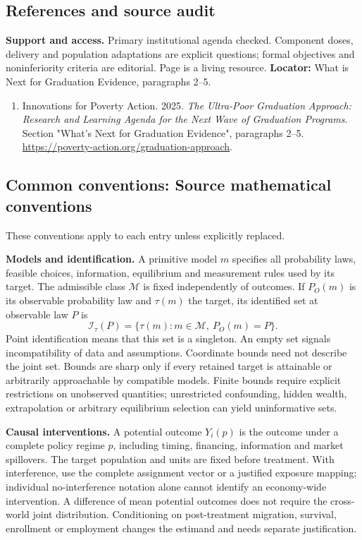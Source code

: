 \documentclass[11pt,a4paper]{article}
\begin{document}
\subsection*{References and source audit}
\textbf{Support and access.} Primary institutional agenda checked. Component doses, delivery and population adaptations are explicit questions; formal objectives and noninferiority criteria are editorial. Page is a living resource. \textbf{Locator:} What is Next for Graduation Evidence, paragraphs 2--5.
\begin{enumerate}\raggedright
\item\hypertarget{definitions:source:30007653:1}{} Innovations for Poverty Action. 2025. \emph{The Ultra-Poor Graduation Approach: Research and Learning Agenda for the Next Wave of Graduation Programs}. Section "What’s Next for Graduation Evidence", paragraphs 2–5.
\url{https://poverty-action.org/graduation-approach}.
\end{enumerate}

\subsection*{Common conventions: Source mathematical conventions}

These conventions apply to each entry unless explicitly replaced.

\textbf{Models and identification.} A primitive model \(m\) specifies all probability laws, feasible choices, information, equilibrium and measurement rules used by its target. The admissible class \(\mathcal M\) is fixed independently of outcomes. If \(P_O(m)\) is its observable probability law and \(\tau(m)\) the target, its identified set at observable law \(P\) is
\[
 \mathcal I_\tau(P)=\{\tau(m):m\in\mathcal M,\ P_O(m)=P\}.
\]
Point identification means that this set is a singleton. An empty set signals incompatibility of data and assumptions. Coordinate bounds need not describe the joint set. Bounds are sharp only if every retained target is attainable or arbitrarily approachable by compatible models. Finite bounds require explicit restrictions on unobserved quantities; unrestricted confounding, hidden wealth, extrapolation or arbitrary equilibrium selection can yield uninformative sets.

\textbf{Causal interventions.} A potential outcome \(Y_i(p)\) is the outcome under a complete policy regime \(p\), including timing, financing, information and market spillovers. The target population and units are fixed before treatment. With interference, use the complete assignment vector or a justified exposure mapping; individual no-interference notation alone cannot identify an economy-wide intervention. A difference of mean potential outcomes does not require the cross-world joint distribution. Conditioning on post-treatment migration, survival, enrollment or employment changes the estimand and needs separate justification.
\end{document}
